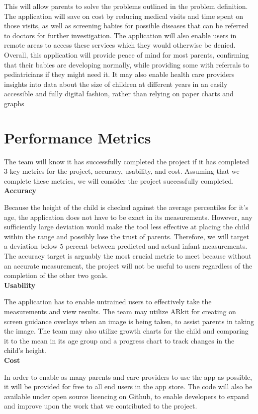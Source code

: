 \documentclass[10pt, draftclsnofoot, letterpaper, margin=.75in, onecolumn]{IEEEtran}
\begin{document}
\par \noindent This will allow parents to solve the problems outlined in the problem definition. The application will save on cost by reducing medical visits and time spent on those visits, as well as screening babies for possible diseases that can be referred to doctors for further investigation. The application will also enable users in remote areas to access these services which they would otherwise be denied. Overall, this application will provide peace of mind for most parents, confirming that their babies are developing normally, while providing some with referrals to pediatricians if they might need it. It may also enable health care providers insights into data about the size of children at different years in an easily accessible and fully digital fashion, rather than relying on paper charts and graphs\\

\section{Performance Metrics}
\par \noindent The team will know it has successfully completed the project if it has completed 3 key metrics for the project, accuracy, usability, and cost. Assuming that we complete these metrics, we will consider the project successfully completed.\\

\textbf{Accuracy}
\par \noindent Because the height of the child is checked against the average percentiles for it’s age, the application does not have to be exact in its measurements. However, any sufficiently large deviation would make the tool less effective at placing the child within the range and possibly lose the trust of parents. Therefore, we will target a deviation below 5 percent between predicted and actual infant measurements. The accuracy target is arguably the most crucial metric to meet because without an accurate measurement, the project will not be useful to users regardless of the completion of the other two goals.\\

\textbf{Usability}
\par \noindent The application has to enable untrained users to effectively take the measurements and view results. The team may utilize ARkit for creating on screen guidance overlays when an image is being taken, to assist parents in taking the image. The team may also utilize growth charts for the child and comparing it to the mean in its age group and a progress chart to track changes in the child's height.\\

\textbf{Cost}
\par \noindent In order to enable as many parents and care providers to use the app as possible, it will be provided for free to all end users in the app store.  The code will also be available under open source licencing on Github, to enable developers to expand and improve upon the work that we contributed to the project.\\




\end{document}
